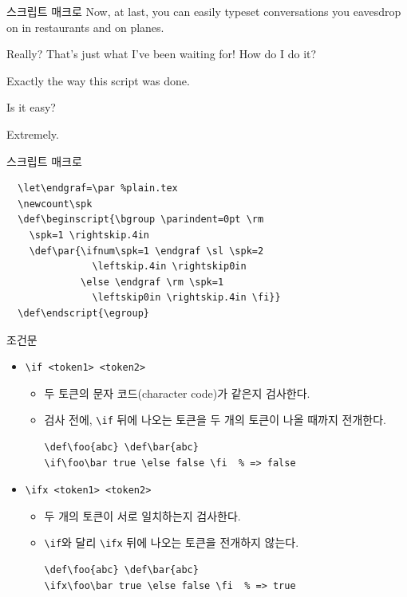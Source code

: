 \documentclass{beamer}
\begin{document}
\begin{frame}[fragile]{스크립트 매크로}
  \hsize 3in
  \beginscript
  Now, at last, you can easily typeset
  conversations you eavesdrop on in
  restaurants and on planes.
  
  Really? That's just what I've been waiting
  for! How do I do it?
  
  Exactly the way this script was done.
  
  Is it easy?
  
  Extremely.
  \endscript
\end{frame}


%
\begin{frame}[fragile]{스크립트 매크로}
\begin{verbatim}
  \let\endgraf=\par %plain.tex 
  \newcount\spk
  \def\beginscript{\bgroup \parindent=0pt \rm
    \spk=1 \rightskip.4in
    \def\par{\ifnum\spk=1 \endgraf \sl \spk=2
               \leftskip.4in \rightskip0in
             \else \endgraf \rm \spk=1
               \leftskip0in \rightskip.4in \fi}}
  \def\endscript{\egroup}
\end{verbatim}
\end{frame}


%
\begin{frame}[fragile]{조건문}
  \begin{itemize}
  \item \verb+\if <token1> <token2>+
    \begin{itemize}
    \item 두 토큰의 문자 코드(character code)가 같은지 검사한다.
    \item 검사 전에, \verb+\if+ 뒤에 나오는 토큰을 두 개의 토큰이 나올 때까지 전개한다.
\begin{verbatim}
\def\foo{abc} \def\bar{abc}
\if\foo\bar true \else false \fi  % => false
\end{verbatim}
    \end{itemize}
  \item \verb+\ifx <token1> <token2>+
    \begin{itemize}
    \item 두 개의 토큰이 서로 일치하는지 검사한다.
    \item \verb+\if+와 달리 \verb+\ifx+ 뒤에 나오는 토큰을 전개하지 않는다.
\begin{verbatim}
\def\foo{abc} \def\bar{abc}
\ifx\foo\bar true \else false \fi  % => true
\end{verbatim}
    \end{itemize}
  \end{itemize}
\end{frame}
\end{document}
